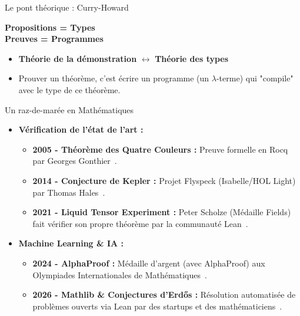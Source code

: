 \documentclass[aspectratio=169]{beamer}
\begin{document}
\begin{frame}{Le pont théorique : Curry-Howard}
  \begin{center}
    \LARGE \textbf{Propositions = Types}\\
    \LARGE \textbf{Preuves = Programmes}
  \end{center}
  \vspace{0.5cm}
  \begin{itemize}
    \item \textbf{Théorie de la démonstration} $\longleftrightarrow$ \textbf{Théorie des types}
    \item Prouver un théorème, c'est écrire un programme (un $\lambda$-terme) qui "compile" avec le type de ce théorème.
  \end{itemize}
\end{frame}

\begin{frame}{Un raz-de-marée en Mathématiques}
  \begin{itemize}
    \item \textbf{Vérification de l'état de l'art :}
      \begin{itemize}
        \item \textbf{2005 - Théorème des Quatre Couleurs :} Preuve formelle en Rocq par Georges Gonthier~\cite{gonthier2008fourcolor}.
        \item \textbf{2014 - Conjecture de Kepler :} Projet Flyspeck (Isabelle/HOL Light) par Thomas Hales~\cite{hales2017flyspeck}.
        \item \textbf{2021 - Liquid Tensor Experiment :} Peter Scholze (Médaille Fields) fait vérifier son propre théorème par la communauté Lean~\cite{scholze2021liquid}.
      \end{itemize}
    \item \textbf{Machine Learning \& IA :}
      \begin{itemize}
        \item \textbf{2024 - AlphaProof :} Médaille d'argent (avec AlphaProof) aux Olympiades Internationales de Mathématiques~\cite{alphaproof2024}.
        \item \textbf{2026 - Mathlib \& Conjectures d'Erdős :} Résolution automatisée de problèmes ouverts via Lean par des startups et des mathématiciens~\cite{erdosproblems}.
      \end{itemize}
  \end{itemize}
\end{frame}
\end{document}
